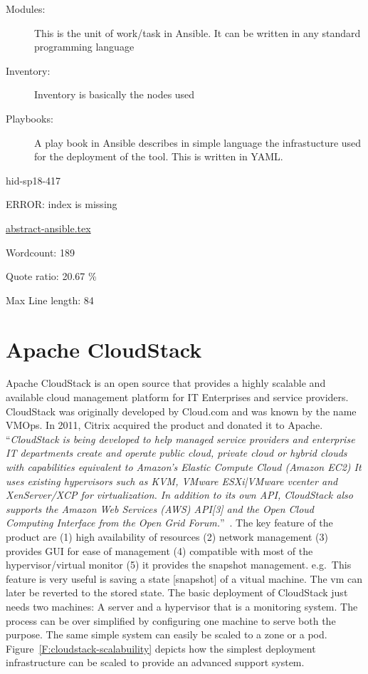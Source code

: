 \begin{description}
\item[Modules:] This is the unit of work/task in Ansible. It
  can be written in any standard programming language
\item[Inventory:] Inventory is basically the nodes used
\item[Playbooks:] A play book in Ansible describes in simple
  language the infrastucture used for the deployment of the tool. This
  is written in YAML. 
\end{description}


\begin{IU}

hid-sp18-417

ERROR: index is missing

\href{https://github.com/cloudmesh-community/hid-sp18-417/blob/master//technology/abstract-ansible.tex}{abstract-ansible.tex}

 

Wordcount: 189


Quote ratio: 20.67 \%
 
Max Line length: 84
\end{IU}


\section{Apache CloudStack}

Apache CloudStack is an open source that provides a highly scalable
and available cloud management platform for IT Enterprises and service
providers. CloudStack was originally developed by Cloud.com and was
known by the name VMOps.  In 2011, Citrix acquired the product and
donated it to Apache.  \color{blue}``\emph{CloudStack is being developed to help managed
service providers and enterprise IT departments create and operate
public cloud, private cloud or hybrid clouds with capabilities
equivalent to Amazon's Elastic Compute Cloud (Amazon EC2) It uses
existing hypervisors such as KVM, VMware ESXi|VMware vcenter and
XenServer/XCP for virtualization. In addition to its own API,
CloudStack also supports the Amazon Web Services (AWS) API[3] and the
Open Cloud Computing Interface from the Open Grid
Forum.}''\color{black}~\cite{hid-sp18-417-wiki-cloudStack}.  The key feature of the
product are (1) high availability of resources (2) network management
(3) provides GUI for ease of management (4) compatible with most of
the hypervisor/virtual monitor (5) it provides the snapshot
management. e.g.\ This feature is very useful is saving a state
[snapshot] of a vitual machine.  The vm can later be reverted to the
stored state.  The basic deployment of CloudStack just needs two
machines: A server and a hypervisor that is a monitoring system.  The
process can be over simplified by configuring one machine to serve
both the purpose.  The same simple system can easily be scaled to a
zone or a pod.  Figure~\ref{F:cloudstack-scalabuility} depicts how the
simplest deployment infrastructure can be scaled to provide an
advanced support system.


